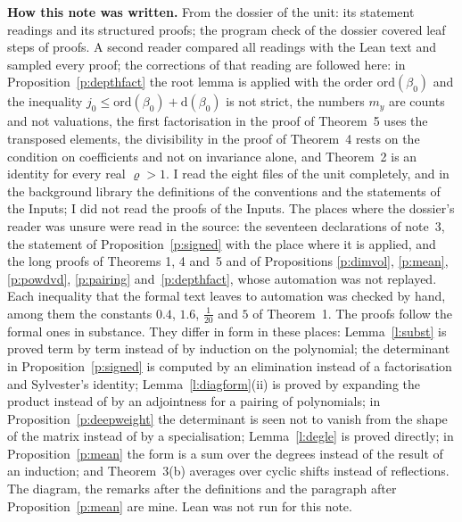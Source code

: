 \documentclass[11pt,a4paper]{article}
\newcommand{\m}[1]{\mbox{$#1$}}        %
\newcommand{\subhead}[1]{\par\addvspace{9pt plus 2pt}\Needspace{4\baselineskip}\noindent\textbf{#1}\enspace\ignorespaces}
\theoremstyle{plainx}
\theoremstyle{uprightx}
\begin{document}
\subhead{How this note was written.} From the dossier of the unit: its \UnitMembers{} statement readings and its
structured proofs; the program check of the dossier covered \UnitSteps{} leaf steps of \UnitProofs{} proofs. A
second reader compared all readings with the Lean text and sampled every proof; the corrections of that
reading are followed here: in Proposition~\ref{p:depthfact} the root lemma is applied with the order
\m{\mathrm{ord}(\beta_0)} and the inequality \m{j_0\le\mathrm{ord}(\beta_0)+\mathrm{d}(\beta_0)} is not strict, the
numbers \m{m_y} are counts and not valuations, the first factorisation in the proof of Theorem~5 uses the
transposed elements, the divisibility in the proof of Theorem~4 rests on the condition on coefficients and not
on invariance alone, and Theorem~2 is an identity for every real \m{\varrho>1}. I read the eight files of the
unit completely, and in the background library the definitions of the conventions and the statements of the
Inputs; I did not read the proofs of the Inputs. The places where the dossier's reader was unsure were read in
the source: the seventeen declarations of note~3, the statement of Proposition~\ref{p:signed} with the place
where it is applied, and the long proofs of Theorems 1, 4 and~5 and of Propositions \ref{p:dimvol},
\ref{p:mean}, \ref{p:powdvd}, \ref{p:pairing} and~\ref{p:depthfact}, whose automation was not replayed. Each
inequality that the formal text leaves to automation was checked by hand, among them the constants $0.4$,
$1.6$, \m{\tfrac1{20}} and $5$ of Theorem~1. The proofs follow the formal ones in substance. They differ in
form in these places: Lemma~\ref{l:subst} is proved term by term instead of by induction on the polynomial;
the determinant in Proposition~\ref{p:signed} is computed by an elimination instead of a factorisation and
Sylvester's identity; Lemma~\ref{l:diagform}(ii) is proved by expanding the product instead of by an adjointness
for a pairing of polynomials; in Proposition~\ref{p:deepweight} the determinant is seen not to vanish from the
shape of the matrix instead of by a specialisation; Lemma~\ref{l:degle} is proved directly; in
Proposition~\ref{p:mean} the form is a sum over the degrees instead of the result of an induction; and
Theorem~3(b) averages over cyclic shifts instead of reflections. The diagram, the remarks after the definitions
and the paragraph after Proposition~\ref{p:mean} are mine. Lean was not run for this note.
\end{document}
